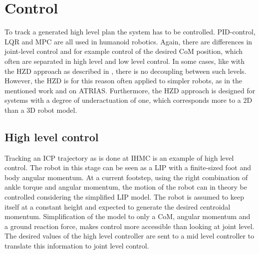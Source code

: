 \section{Control}
To track a generated high level plan the system has to be controlled. PID-control, LQR and MPC are all used in humanoid robotics. Again, there are differences in joint-level control and for example control of the desired \ac{CoM} position, which often are separated in high level and low level control. In some cases, like with the \ac{HZD} approach as described in \cite{westervelt2003hybrid}, there is no decoupling between such levels. However, the \ac{HZD} is for this reason often applied to simpler robots, as in the mentioned work and on ATRIAS. Furthermore, the \ac{HZD} approach is designed for systems with a degree of underactuation of one, which corresponds more to a \ac{2D} than a \ac{3D} robot model. 

\subsection{High level control}
Tracking an \ac{ICP} trajectory as is done at IHMC is an example of high level control. The robot in this stage can be seen as a \ac{LIP} with a finite-sized foot and body angular momentum. At a current footstep, using the right combination of ankle torque and angular momentum, the motion of the robot can in theory be controlled considering the simplified \ac{LIP} model. The robot is assumed to keep itself at a constant height and expected to generate the desired centroidal momentum. Simplification of the model to only a \ac{CoM}, angular momentum and a ground reaction force, makes control more accessible than looking at joint level. The desired values of the high level controller are sent to a mid level controller to translate this information to joint level control.

